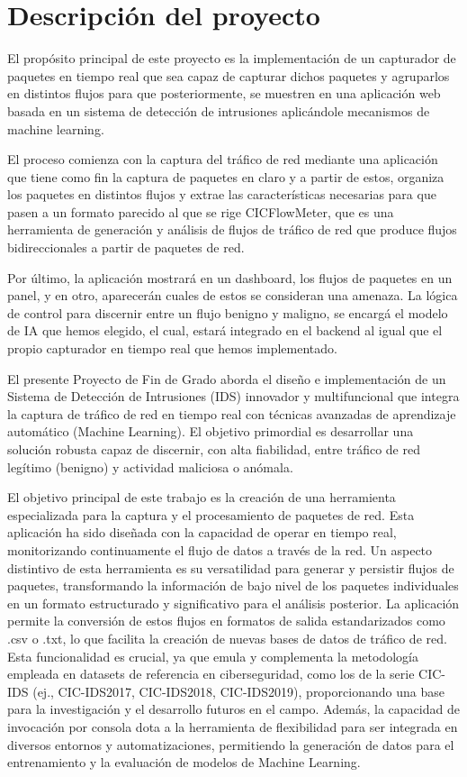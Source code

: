 \section{Descripción del proyecto}
El propósito principal de este proyecto es la implementación de un capturador de paquetes en tiempo real que sea capaz de capturar dichos paquetes y agruparlos en distintos flujos para que posteriormente, se muestren en una aplicación web basada en un sistema de detección de intrusiones aplicándole mecanismos de machine learning.

El proceso comienza con la captura del tráfico de red mediante una aplicación que tiene como fin la captura de paquetes en claro y a partir de estos, organiza los paquetes en distintos flujos y extrae las características necesarias para que pasen a un formato parecido al que se rige CICFlowMeter, que es una herramienta de generación y análisis de flujos de tráfico de red que produce flujos bidireccionales a partir de paquetes de red.

Por último, la aplicación mostrará en un dashboard, los flujos de paquetes en un panel, y en otro, aparecerán cuales de estos se consideran una amenaza. La lógica de control para discernir entre un flujo benigno y maligno, se encargá el modelo de IA que hemos elegido, el cual, estará integrado en el backend al igual que el propio capturador en tiempo real que hemos implementado.

El presente Proyecto de Fin de Grado aborda el diseño e implementación de un Sistema de Detección de Intrusiones (IDS) innovador y multifuncional que integra la captura de tráfico de red en tiempo real con técnicas avanzadas de aprendizaje automático (Machine Learning). El objetivo primordial es desarrollar una solución robusta capaz de discernir, con alta fiabilidad, entre tráfico de red legítimo (benigno) y actividad maliciosa o anómala.

El objetivo principal de este trabajo es la creación de una herramienta especializada para la captura y el procesamiento de paquetes de red. Esta aplicación ha sido diseñada con la capacidad de operar en tiempo real, monitorizando continuamente el flujo de datos a través de la red. Un aspecto distintivo de esta herramienta es su versatilidad para generar y persistir flujos de paquetes, transformando la información de bajo nivel de los paquetes individuales en un formato estructurado y significativo para el análisis posterior. La aplicación permite la conversión de estos flujos en formatos de salida estandarizados como .csv o .txt, lo que facilita la creación de nuevas bases de datos de tráfico de red. Esta funcionalidad es crucial, ya que emula y complementa la metodología empleada en datasets de referencia en ciberseguridad, como los de la serie CIC-IDS (ej., CIC-IDS2017, CIC-IDS2018, CIC-IDS2019), proporcionando una base para la investigación y el desarrollo futuros en el campo. Además, la capacidad de invocación por consola dota a la herramienta de flexibilidad para ser integrada en diversos entornos y automatizaciones, permitiendo la generación de datos para el entrenamiento y la evaluación de modelos de Machine Learning.

